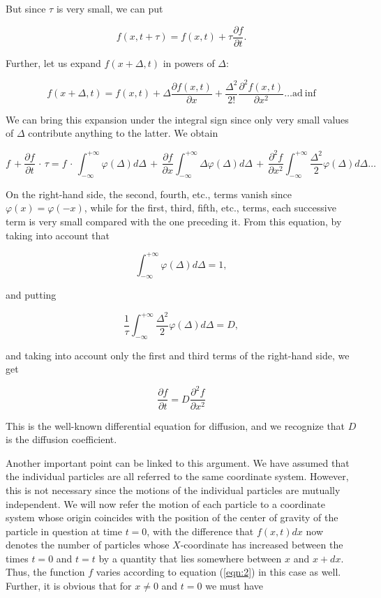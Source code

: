 \documentclass{article}
\begin{document}
But since $\tau$ is very small, we can put

\[f(x,t+\tau)=f(x,t)+\tau\frac{\partial f}{\partial t}.\]

Further, let us expand $f (x + \Delta, t)$ in powers of $\Delta$:

\[f(x+\Delta, t) =f(x,t)+\Delta \frac{\partial f(x,t)}{\partial x} + \frac{\Delta ^{2}}{2!}
\frac{\partial^{2}f(x,t)}{\partial x^{2}} \ldots \mathrm{ad\: inf} \]

We can bring this expansion under the integral sign since only very small values of $\Delta$ contribute
anything to the latter. We obtain

\[f \, +\frac{\partial f}{\partial t} \, \cdot \, \tau = f \, \cdot \, \int^{+\infty}_{-\infty} \varphi(\Delta)d\Delta  \, +  \, \frac{\partial f}{\partial x} \int^{+\infty}_{-\infty} \Delta\varphi(\Delta)d\Delta \, + \, \frac{\partial ^{2}f}{\partial x^{2}}
\int^{+\infty}_{-\infty} \frac{\Delta ^{2}}{2} \varphi(\Delta)d\Delta \ldots  \]

On the right-hand side, the second, fourth, etc., terms vanish since $\varphi(x) = \varphi (-x)$, while for the
first, third, fifth, etc., terms, each successive term is very small compared with the one preceding
it. From this equation, by taking into account that

\[\int^{+\infty}_{-\infty} \varphi(\Delta)d\Delta = 1, \]

\noindent and putting

\[\frac{1}{\tau} \int^{+\infty}_{-\infty} \frac{\Delta^{2}}{2} \varphi(\Delta)d\Delta=D, \]

and taking into account only the first and third terms of the right-hand side, we get

\[\frac{\partial f}{\partial t} = D \frac{\partial^{2} f}{\partial x^{2}} \]

This is the well-known differential equation for diffusion, and we recognize that $D$ is the diffusion
coefficient.

Another important point can be linked to this argument. We have assumed that the individual
particles are all referred to the same coordinate system. However, this is not necessary since the
motions of the individual particles are mutually independent. We will now refer the motion of each
particle to a coordinate system whose origin coincides with the position of the center of gravity of
the particle in question at time $t = 0$, with the difference that $f (x, t)dx$ now denotes the number of
particles whose $X$-coordinate has increased between the times $t = 0$ and $t = t$ by a quantity that
lies somewhere between $x$ and $x + dx$. Thus, the function $f$ varies according to equation (\ref{eqn:2}) in
this case as well. Further, it is obvious that for $x\neq 0$ and $t = 0$ we must have
\end{document}

